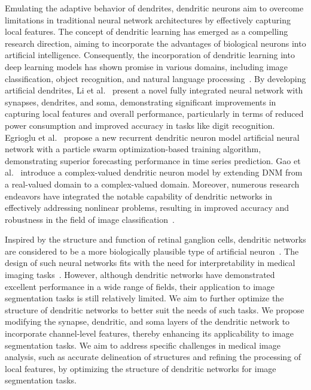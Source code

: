 \documentclass[review]{elsarticle}
\begin{document}
	Emulating the adaptive behavior of dendrites, dendritic neurons aim to overcome limitations in traditional neural network architectures by effectively capturing local features. The concept of dendritic learning has emerged as a compelling research direction, aiming to incorporate the advantages of biological neurons into artificial intelligence. Consequently, the incorporation of dendritic learning into deep learning models has shown promise in various domains, including image classification, object recognition, and natural language processing~\cite{ji2022survey}. By developing artificial dendrites, Li et al.~\cite{li2020power} present a novel fully integrated neural network with synapses, dendrites, and soma, demonstrating significant improvements in capturing local features and overall performance, particularly in terms of reduced power consumption and improved accuracy in tasks like digit recognition. Egrioglu et al.~\cite{egrioglu2022recurrent} propose a new recurrent dendritic neuron model artificial neural network with a particle swarm optimization-based training algorithm, demonstrating superior forecasting performance in time series prediction. Gao et al.~\cite{gao2021fully} introduce a complex-valued dendritic neuron model by extending DNM from a real-valued domain to a complex-valued domain. Moreover, numerous research endeavors have integrated the notable capability of dendritic networks in effectively addressing nonlinear problems, resulting in improved accuracy and robustness in the field of image classification~\cite{zhang2024dendritic,li2023dendritic,liu2021dendrite}.

	Inspired by the structure and function of retinal ganglion cells, dendritic networks are considered to be a more biologically plausible type of artificial neuron~\cite{zhang2024dendritic,bas2024robust,koch1982retinal}. The design of such neural networks fits with the need for interpretability in medical imaging tasks~\cite{zhang2024lightweight}. However, although dendritic networks have demonstrated excellent performance in a wide range of fields, their application to image segmentation tasks is still relatively limited. We aim to further optimize the structure of dendritic networks to better suit the needs of such tasks. We propose modifying the synapse, dendritic, and soma layers of the dendritic network to incorporate channel-level features, thereby enhancing its applicability to image segmentation tasks. We aim to address specific challenges in medical image analysis, such as accurate delineation of structures and refining the processing of local features, by optimizing the structure of dendritic networks for image segmentation tasks.
\end{document}
